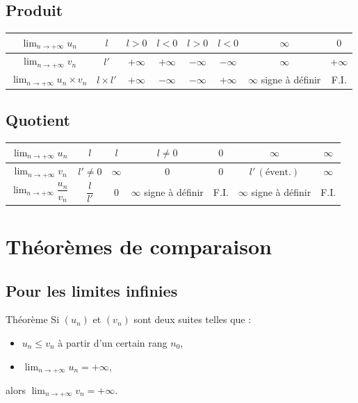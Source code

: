 \documentclass[11pt,a4paper]{article}
\begin{document}
\subsection{Produit}
\begin{center}
\begin{tabular}{|c|c|c|c|c|c|c|c|}
\hline
$\displaystyle \lim_{n\to+\infty} u_n$ & $l$ & $l>0$ & $l<0$ & $l>0$ & $l<0$ & $\infty$ & $0$ \\ \hline
$\displaystyle \lim_{n\to+\infty} v_n$ & $l'$ & $+\infty$ & $+\infty$ & $-\infty$ & $-\infty$ & $\infty$ & $+\infty$ \\ \hline
$\displaystyle \lim_{n\to+\infty} u_n\times v_n$ & $l\times l'$ & $+\infty$ & $-\infty$ & $-\infty$ & $+\infty$ & $\infty$ signe à définir & F.I. \\ \hline
\end{tabular}
\end{center}

\subsection{Quotient}
\begin{center}
\begin{tabular}{|c|c|c|c|c|c|c|}
\hline
$\displaystyle \lim_{n\to+\infty} u_n$ & $l$ & $l$ & $l\neq 0$ & $0$ & $\infty$ & $\infty$ \\ \hline
$\displaystyle \lim_{n\to+\infty} v_n$ & $l'\neq 0$ & $\infty$ & $0$ & $0$ & $l'\,(\text{évent.})$ & $\infty$ \\ \hline
$\displaystyle \lim_{n\to+\infty} \dfrac{u_n}{v_n}$ & $\dfrac{l}{l'}$ & $0$ & $\infty$ signe à définir & F.I. & $\infty$ signe à définir & F.I. \\ \hline
\end{tabular}
\end{center}

\section{Théorèmes de comparaison}

\subsection{Pour les limites infinies}

\begin{boiteProp}{Théorème}
    Si $(u_n)$ et $(v_n)$ sont deux suites telles que :
    \begin{itemize}
        \item $u_n \leq v_n$ à partir d'un certain rang $n_0$,
        \item $\displaystyle \lim_{n \to +\infty} u_n = +\infty$,
    \end{itemize}
    alors $\displaystyle \lim_{n \to +\infty} v_n = +\infty$.
\end{boiteProp}
\end{document}
